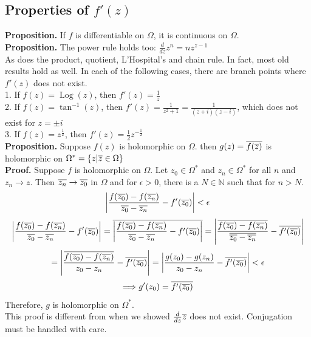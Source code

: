 \documentclass[11pt]{article}
\DeclarePairedDelimiter\abs{\lvert}{\rvert}
\begin{document}
\subsection{Properties of $f'(z)$}
\textbf{Proposition.} If $f$ is differentiable on $\Omega$, it is continuous on $\Omega$. \\
\textbf{Proposition.} The power rule holds too: $\frac{d}{dz}z^n = nz^{z - 1}$\\
As does the product, quotient, L'Hospital's and chain rule. In fact, most old results hold as well. 
In each of the following cases, there are branch points where $f'(z)$ does not exist. \\
1. If $f(z) = \operatorname{Log}(z)$, then $f'(z) = \frac{1}{z}$ \\
2. If $f(z) = \tan^{-1}(z)$, then $f'(z) = \frac{1}{z^2 + 1} = \frac{1}{(z + i)(z - i)}$, which does not exist for $z = \pm i$ \\
3. If $f(z) = z^\frac{1}{2}$, then $f'(z) = \frac{1}{2}z^{-\frac{1}{2}}$ \\

\textbf{Proposition.} Suppose $f(z)$ is holomorphic on $\Omega$. then $g(z) = \overline{f(\overline{z})}$ is holomorphic on $\Omega^{\ast} = \{z|\overline{z} \in \Omega\}$ \\
\textbf{Proof.} Suppose $f$ is holomorphic on $\Omega$. Let $z_0 \in \Omega^{\ast}$ and $z_n \in \Omega^{\ast}$ for all $n$ and $z_n \to z$. Then $\overline{z_n} \to \overline{z_0}$ in $\Omega$ and for $\epsilon > 0$, there is a $N \in \mathbb{N}$ such that for $n > N$. 
$$\abs*{\frac{f(\conj{z_0}) - f(\conj{z_n})}{\conj{z_0} - \conj{z_n}} - f'(\conj{z_0})} < \epsilon$$ 
$$\abs*{\frac{f(\conj{z_0}) - f(\conj{z_n})}{\conj{z_0} - \conj{z_n}} - f'(\conj{z_0})} = \conj{\abs*{\frac{f(\conj{z_0}) - f(\conj{z_n})}{\conj{z_0} - \conj{z_n}} - f'(\conj{z_0})}} = \abs*{\frac{\conj{{f(\conj{z_0}) - f(\conj{z_n})}}}{\conj{\conj{z_0} - \conj{z_n}}} - \conj{f'(\conj{z_0})}} $$
$$ = \abs*{\frac{\conj{{f(\conj{z_0}) - f(\conj{z_n})}}}{z_0 - z_n} - \conj{f'(\conj{z_0})}} = \abs*{\frac{g(z_0) - g(z_n)}{z_0 - z_n} - \conj{f'(\conj{z_0})}} < \epsilon$$
$$\Longrightarrow g'(z_0) = \overline{f'(\overline{z_0})}$$
Therefore, $g$ is holomorphic on $\Omega^\ast$. \\
This proof is different from when we showed $\frac{d}{dz}\overline{z}$ does not exist. Conjugation must be handled with care. 
\end{document}
